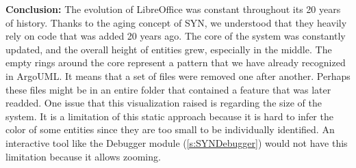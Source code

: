 \bigbreak
\textbf{Conclusion:} The evolution of LibreOffice was constant throughout its 20 years of history. 
Thanks to the aging concept of SYN, we understood that they heavily rely on code that was added 20 years ago. The core of the system was constantly updated, and the overall height of entities grew, especially in the middle. The empty rings around the core represent a pattern that we have already recognized in ArgoUML. It means that a set of files were removed one after another. Perhaps these files might be in an entire folder that contained a feature that was later readded. One issue that this visualization raised is regarding the size of the system. It is a limitation of this static approach because it is hard to infer the color of some entities since they are too small to be individually identified. An interactive tool like the Debugger module (\autoref{s:SYNDebugger}) would not have this limitation because it allows zooming. 


